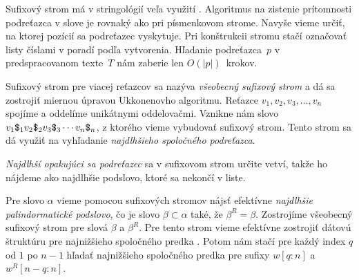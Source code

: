 Sufixový strom má v stringológií veľa využití \citep{gusfield}. Algoritmus na 
zistenie prítomnosti podreťazca v slove je rovnaký ako pri písmenkovom strome. 
Navyše vieme určiť, na ktorej pozícií sa podreťazec vyskytuje. Pri 
konštrukcii stromu stačí označovať listy číslami v poradí podľa vytvorenia. 
Hľadanie podreťazca~$p$ v predspracovanom texte~$T$ nám zaberie len 
$O(|p|)$~krokov.

Sufixový strom pre viacej reťazcov sa nazýva \emph{všeobecný sufixový strom} 
a dá sa zostrojiť miernou úpravou Ukkonenovho algoritmu. Reťazce $v_1, v_2, 
v_3, \ldots, v_n$ spojíme a oddelíme unikátnymi oddelovačmi. Vznikne nám slovo 
$v_1\hbox{\tt\$}_1v_2\hbox{\tt\$}_2v_3\hbox{\tt\$}_3\cdots v_n\hbox{\tt\$}_n$, z ktorého vieme vybudovať sufixový 
strom. Tento strom sa dá využiť na vyhľadanie \emph{najdlhšieho spoločného 
podreťazca}. 

\emph{Najdlhší opakujúci sa podreťazec} sa v sufixovom strom určite vetví, 
takže ho nájdeme ako najdlhšie podslovo, ktoré sa nekončí v liste.

Pre slovo $\alpha$ vieme pomocou sufixových stromov nájsť efektívne 
\emph{najdlhšie palindormatické podslovo}, čo je slovo $\beta \subset \alpha$ 
také, že $\beta^R = \beta$. Zostrojíme všeobecný sufixový strom pre slová 
$\beta$ a $\beta^R$. Pre tento strom vieme efektívne zostrojiť dátovú 
štruktúru pre najnižšieho spoločného predka \citep{lca}. Potom nám stačí 
pre každý index $q$ od $1$ po $n-1$ hľadať najnižšieho spoločného predka pre 
sufixy $w[q:n]$ a $w^R[n-q:n]$.

% 
% 


